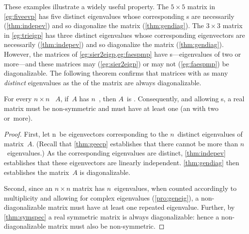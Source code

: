 These examples illustrate a widely useful property.
The \(5\times 5\) matrix in \autoref{eg:fiveevp} has five distinct eigenvalues whose corresponding s are necessarily  (\autoref{thm:indepev}) and so diagonalize the matrix (\autoref{thm:gendiag}).
The \(3\times 3\) matrix in \autoref{eg:trieigp} has three distinct eigenvalues whose corresponding eigenvectors are necessarily  (\autoref{thm:indepev}) and so diagonalize the matrix (\autoref{thm:gendiag}).
However, the matrices of \cref{eg:sier2eigp,eg:faespmp} have s---eigenvalues of  two or more---and these matrices may (\autoref{eg:sier2eigp}) or may not (\autoref{eg:faespmp}) be diagonalizable.
The following theorem confirms that matrices with as many \emph{distinct} eigenvalues as the  of the matrix are always diagonalizable.






\begin{theorem} \label{thm:dlamd} 
For every \(n\times n\) ~\(A\), if~\(A\) has \(n\)~, then \(A\)~is .
Consequently, and allowing s, a real  matrix must be non-symmetric and must have at least one  (an  with  two or~more).
\end{theorem}
\begin{proof}  
First, let \hlist\vv n\ be eigenvectors corresponding to the \(n\)~distinct eigenvalues of matrix~\(A\).
(Recall that \autoref{thm:geecp} establishes that there cannot be more than \(n\)~eigenvalues.)
As the corresponding eigenvalues are distinct, \autoref{thm:indepev} establishes that these eigenvectors are linearly independent.
\autoref{thm:gendiag} then establishes the matrix~\(A\) is diagonalizable.

Second, since an \(n\times n\) matrix has \(n\)~eigenvalues, when counted accordingly to multiplicity and allowing for complex eigenvalues (\autoref{pro:geneig}), a non-diagonalizable matrix must have at least one repeated eigenvalue.  
Further, by \autoref{thm:symspec} a real symmetric matrix is always diagonalizable: hence a non-diagonalizable matrix must also be non-symmetric.
\end{proof}


